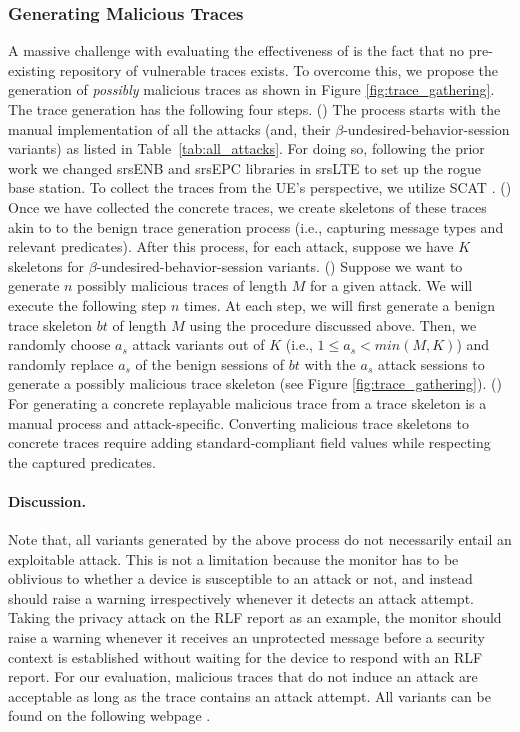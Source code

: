 \subsubsection{Generating Malicious Traces}
A massive challenge with evaluating the effectiveness of
\system is the fact that no pre-existing
repository of vulnerable traces exists. To overcome this, we propose the generation of \emph{possibly} malicious
traces as shown in Figure \ref{fig:trace_gathering}. The trace generation has the following four steps.
() The process starts with the manual implementation of all the attacks (and, their $\beta$-undesired-behavior-session variants)
as listed in Table~\ref{tab:all_attacks}. For doing so,
following the prior work \cite{kim_ltefuzz_sp19, privacy_ndss16, TORPEDO,
lteinspector, park2016white, how_not_to_break_crypto} we changed srsENB and srsEPC libraries in
srsLTE \cite{gomez2016srslte} to set up the rogue base station.
To collect the traces from the UE's perspective, we utilize SCAT \cite{SCAT}.
() Once we have collected the concrete traces, we create skeletons of these traces akin to
to the benign trace generation process (i.e., capturing message types and relevant predicates).
After this process, for each attack, suppose we have $K$ skeletons  for $\beta$-undesired-behavior-session variants.
() Suppose we want to generate $n$ possibly malicious traces of length $M$ for a given attack.
We will execute the following step $n$ times. At each step, we will first generate a
benign trace skeleton $bt$ of length $M$ using the procedure discussed above. Then,
we randomly choose $a_s$ attack variants out of $K$
(i.e., $1\leq a_s < min(M, K)$) and randomly replace $a_s$ of the benign sessions of $bt$ %
with the $a_s$ attack sessions to generate a possibly malicious  trace skeleton (see Figure \ref{fig:trace_gathering}).
() For generating a concrete replayable malicious trace from a trace skeleton is a manual process and
attack-specific. Converting malicious trace skeletons to concrete traces require adding standard-compliant
field values while respecting the captured predicates.


\paragraph{Discussion.} Note that, all variants generated by the above process do not necessarily entail
an exploitable attack. This is not a limitation because the monitor has to be oblivious to whether a device is
susceptible to an attack or not, and instead should raise a warning irrespectively whenever it detects an attack attempt.
Taking the privacy attack on the RLF report as an example, the monitor should raise a warning whenever it receives
an unprotected \ueInformationRequest message before a security context is established without waiting for the
device to respond with an RLF report. For our evaluation, malicious traces that do not induce an attack are acceptable
as long as the trace contains an attack attempt. All variants can be found on
the following webpage \cite{phoenix_webpage}.




